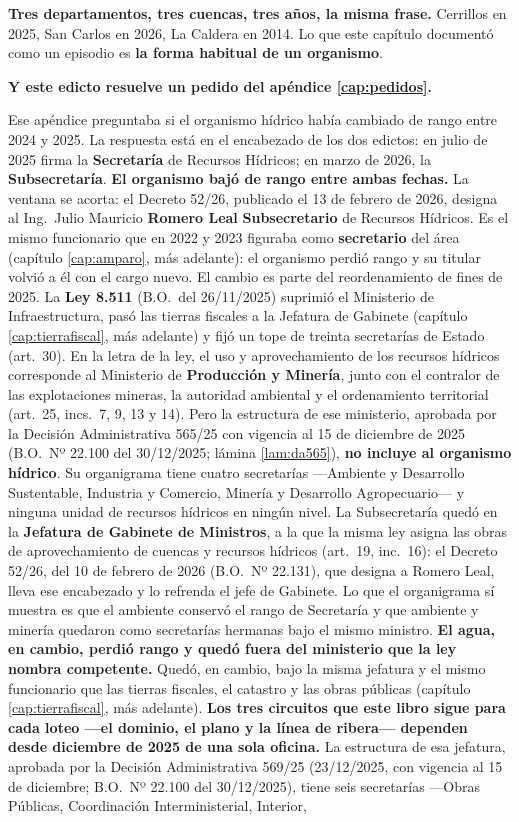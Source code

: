 \textbf{Tres departamentos, tres cuencas, tres años, la misma frase.} Cerrillos en 2025, San
Carlos en 2026, La Caldera en 2014. Lo que este capítulo documentó como un episodio es
\textbf{la forma habitual de un organismo}.

\begin{cautela}
\textbf{Y este edicto resuelve un pedido del apéndice \ref{cap:pedidos}.}

Ese apéndice preguntaba si el organismo hídrico había cambiado de rango entre 2024 y 2025. La
respuesta está en el encabezado de los dos edictos: en julio de 2025 firma la
\textbf{Secretaría} de Recursos Hídricos; en marzo de 2026, la \textbf{Subsecretaría}.
\textbf{El organismo bajó de rango entre ambas fechas.} La ventana se acorta: el Decreto 52/26, publicado el 13 de febrero de 2026, designa al Ing.\ Julio Mauricio \textbf{Romero Leal} \textbf{Subsecretario} de Recursos Hídricos. Es el mismo funcionario que en 2022 y 2023 figuraba como \textbf{secretario} del área (capítulo \ref{cap:amparo}, más adelante): el organismo perdió rango y su titular volvió a él con el cargo nuevo. El cambio es parte del reordenamiento de fines de 2025. La \textbf{Ley 8.511} (B.O.\ del 26/11/2025) suprimió el Ministerio de Infraestructura, pasó las tierras fiscales a la Jefatura de Gabinete (capítulo \ref{cap:tierrafiscal}, más adelante) y fijó un tope de treinta secretarías de Estado (art.\ 30). En la letra de la ley, el uso y aprovechamiento de los recursos hídricos corresponde al Ministerio de \textbf{Producción y Minería}, junto con el contralor de las explotaciones mineras, la autoridad ambiental y el ordenamiento territorial (art.\ 25, incs.\ 7, 9, 13 y 14). Pero la estructura de ese ministerio, aprobada por la Decisión Administrativa 565/25 con vigencia al 15 de diciembre de 2025 (B.O.\ Nº 22.100 del 30/12/2025; lámina \ref{lam:da565}), \textbf{no incluye al organismo hídrico}. Su organigrama tiene cuatro secretarías ---Ambiente y Desarrollo Sustentable, Industria y Comercio, Minería y Desarrollo Agropecuario--- y ninguna unidad de recursos hídricos en ningún nivel. La Subsecretaría quedó en la \textbf{Jefatura de Gabinete de Ministros}, a la que la misma ley asigna las obras de aprovechamiento de cuencas y recursos hídricos (art.\ 19, inc.\ 16): el Decreto 52/26, del 10 de febrero de 2026 (B.O.\ Nº 22.131), que designa a Romero Leal, lleva ese encabezado y lo refrenda el jefe de Gabinete. Lo que el organigrama sí muestra es que el ambiente conservó el rango de Secretaría y que ambiente y minería quedaron como secretarías hermanas bajo el mismo ministro. \textbf{El agua, en cambio, perdió rango y quedó fuera del ministerio que la ley nombra competente.} Quedó, en cambio, bajo la misma jefatura y el mismo funcionario que las tierras fiscales, el catastro y las obras públicas (capítulo \ref{cap:tierrafiscal}, más adelante). \textbf{Los tres circuitos que este libro sigue para cada loteo ---el dominio, el plano y la línea de ribera--- dependen desde diciembre de 2025 de una sola oficina.} La estructura de esa jefatura, aprobada por la Decisión Administrativa 569/25 (23/12/2025, con vigencia al 15 de diciembre; B.O.\ Nº 22.100 del 30/12/2025), tiene seis secretarías ---Obras Públicas, Coordinación Interministerial, Interior, 
\end{cautela}
